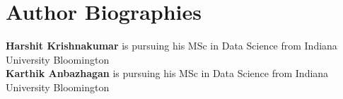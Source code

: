 \documentclass[9pt,twocolumn,twoside]{styles/osajnl}
\begin{document}

 
\section*{Author Biographies}
\begingroup
\setlength\intextsep{0pt}
\begin{minipage}[t][3.2cm][t]{1.0\columnwidth} %
{\bfseries Harshit Krishnakumar} is pursuing his MSc in Data Science from
Indiana University Bloomington\\
{\bfseries Karthik Anbazhagan} is pursuing his MSc in Data Science from
Indiana University Bloomington
\end{minipage}
\endgroup
\end{document}
